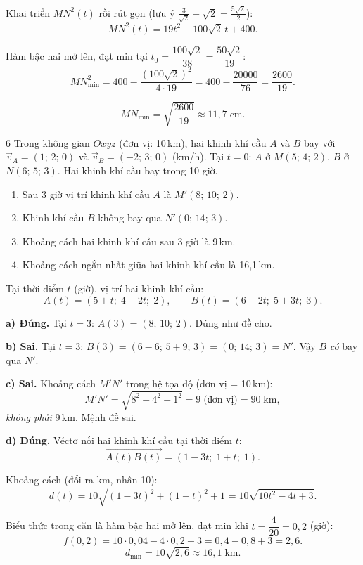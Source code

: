 \begin{loigiai}
Khai triển $MN^2(t)$ rồi rút gọn (lưu ý $\frac{3}{\sqrt{2}} + \sqrt{2} = \frac{5\sqrt{2}}{2}$):
\[ MN^2(t) = 19t^2 - 100\sqrt{2}\,t + 400. \]

Hàm bậc hai mở lên, đạt min tại $t_0 = \dfrac{100\sqrt{2}}{38} = \dfrac{50\sqrt{2}}{19}$:
\[ MN_{\min}^2 = 400 - \frac{(100\sqrt{2})^2}{4 \cdot 19} = 400 - \frac{20000}{76} = \frac{2600}{19}. \]

\[ MN_{\min} = \sqrt{\frac{2600}{19}} \approx \boxed{11{,}7\;\text{cm}}. \]
\end{loigiai}

\separator

\begin{baitoan}{6 \hfill {}}
Trong không gian $Oxyz$ (đơn vị: 10\,km), hai khinh khí cầu $A$ và $B$ bay với $\vec{v}_A = (1;\,2;\,0)$ và $\vec{v}_B = (-2;\,3;\,0)$ (km/h). Tại $t = 0$: $A$ ở $M(5;\,4;\,2)$, $B$ ở $N(6;\,5;\,3)$. Hai khinh khí cầu bay trong 10 giờ.

\begin{enumerate}[label=\alph*), leftmargin=2em]
  \item Sau 3 giờ vị trí khinh khí cầu $A$ là $M'(8;\,10;\,2)$.
  \item Khinh khí cầu $B$ không bay qua $N'(0;\,14;\,3)$.
  \item Khoảng cách hai khinh khí cầu sau 3 giờ là 9\,km.
  \item Khoảng cách ngắn nhất giữa hai khinh khí cầu là 16,1\,km.
\end{enumerate}
\end{baitoan}

\begin{loigiai}
Tại thời điểm $t$ (giờ), vị trí hai khinh khí cầu:
\[ A(t) = (5 + t;\; 4 + 2t;\; 2), \qquad B(t) = (6 - 2t;\; 5 + 3t;\; 3). \]

\textbf{a) Đúng.} Tại $t = 3$: $A(3) = (8;\,10;\,2)$. Đúng như đề cho.

\textbf{b) Sai.} Tại $t = 3$: $B(3) = (6 - 6;\, 5 + 9;\, 3) = (0;\,14;\,3) = N'$. Vậy $B$ \textit{có} bay qua $N'$.

\textbf{c) Sai.} Khoảng cách $M'N'$ trong hệ tọa độ (đơn vị = 10\,km):
\[ M'N' = \sqrt{8^2 + 4^2 + 1^2} = 9 \;\text{(đơn vị)} = 90\;\text{km}, \]
\textit{không phải} 9\,km. Mệnh đề sai.

\textbf{d) Đúng.} Véctơ nối hai khinh khí cầu tại thời điểm $t$:
\[ \overrightarrow{A(t)B(t)} = (1 - 3t;\; 1 + t;\; 1). \]

Khoảng cách (đổi ra km, nhân 10):
\[ d(t) = 10\sqrt{(1 - 3t)^2 + (1+t)^2 + 1} = 10\sqrt{10t^2 - 4t + 3}. \]

Biểu thức trong căn là hàm bậc hai mở lên, đạt min khi $t = \dfrac{4}{20} = 0{,}2$ (giờ):
\[ f(0{,}2) = 10 \cdot 0{,}04 - 4 \cdot 0{,}2 + 3 = 0{,}4 - 0{,}8 + 3 = 2{,}6. \]
\[ d_{\min} = 10\sqrt{2{,}6} \approx \boxed{16{,}1\;\text{km}}. \]
\end{loigiai}

